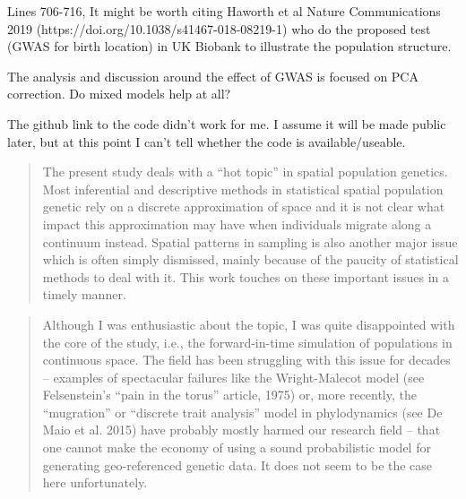 \begin{point}{}
    Lines 706-716, It might be worth citing Haworth et al Nature Communications 2019 (https://doi.org/10.1038/s41467-018-08219-1) who do the proposed test (GWAS for birth location) in UK Biobank to illustrate the population structure.
\end{point}


\begin{point}{}
    The analysis and discussion around the effect of GWAS is focused on PCA correction. Do mixed models help at all?
\end{point}


\begin{point}{}
    The github link to the code didn't work for me. I assume it will be made public later, but at this point I can't tell whether the code is available/useable.
\end{point}




\begin{quote}
    The present study deals with a ``hot topic'' in spatial population genetics. Most
    inferential and descriptive methods in statistical spatial population
    genetic rely on a discrete approximation of space and it is not clear what
    impact this approximation may have when individuals migrate along a
    continuum instead. Spatial patterns in sampling is also another major issue
    which is often simply dismissed, mainly because of the paucity of
    statistical methods to deal with it. This work touches on these important
    issues in a timely manner.
\end{quote}

\begin{quote}
    Although I was enthusiastic about the topic, I was quite disappointed with
    the core of the study, i.e., the forward-in-time simulation of populations in
    continuous space. The field has been struggling with this issue for decades --
    examples of spectacular failures like the Wright-Malecot model (see
    Felsenstein's ``pain in the torus'' article, 1975) or, more recently, the
    ``mugration'' or ``discrete trait analysis'' model in phylodynamics (see De Maio
    et al. 2015) have probably mostly harmed our research field -- that one cannot
    make the economy of using a sound probabilistic model for generating
    geo-referenced genetic data. It does not seem to be the case here
    unfortunately.  
\end{quote}

